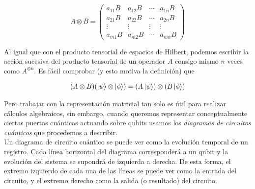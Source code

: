 \documentclass[11pt, spanish]{report}
\numberwithin{equation}{section}
\numberwithin{defin}{section}
\begin{document}
\begin{equation}
A\otimes B =\begin{pmatrix}
a_{11}B & a_{12}B & \cdots & a_{1n}B \\
a_{21}B & a_{22}B & \cdots & a_{2n}B \\
\vdots & \vdots & \vdots & \vdots \\
a_{m1}B & a_{m2}B & \cdots & a_{mn}B
\end{pmatrix}
\end{equation}


Al igual que con el producto tensorial de espacios de Hilbert, podemos escribir la acción sucesiva del producto tensorial de un operador $A$ consigo mismo $n$ veces como $A^{\otimes n}$. Es fácil comprobar (y esto motiva la definición) que 

\begin{equation}
(A\otimes B)(\ket{\psi}\otimes\ket{\phi})=(A\ket{\psi})\otimes(B\ket{\phi})
\end{equation}

Pero trabajar con la representación matricial tan solo es útil para realizar cálculos algebraicos, sin embargo, cuando queremos representar conceptualmente ciertas puertas cuánticas actuando sobre qubits usamos los \emph{diagramas de circuitos cuánticos} que procedemos a describir.\\

Un diagrama de circuito cuántico se puede ver como la evolución temporal de un registro. Cada línea horizontal del diagrama corresponderá a un qubit y la evolución del sistema se supondrá de izquierda a derecha. De esta forma, el extremo izquierdo de cada una de las líneas se puede ver como la entrada del circuito, y el extremo derecho como la salida (o resultado) del circuito.\\
\end{document}
